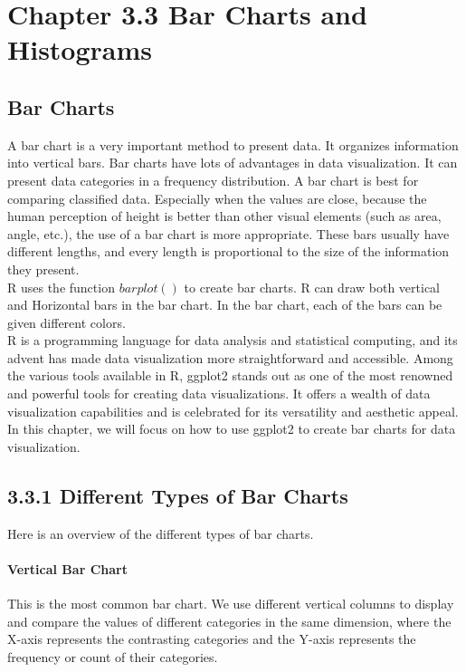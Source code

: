 \documentclass{article}\usepackage[]{graphicx}\usepackage[]{xcolor}
\begin{document}
\section*{Chapter 3.3 Bar Charts and Histograms}
\subsection*{Bar Charts}
A bar chart is a very important method to present data. It organizes information into vertical bars.  Bar charts have lots of advantages in data visualization. It can present data categories in a frequency distribution. A bar chart is best for comparing classified data. Especially when the values are close, because the human perception of height is better than other visual elements (such as area, angle, etc.), the use of a bar chart is more appropriate. These bars usually have different lengths, and every length is proportional to the size of the information they present.\\
R uses the function $barplot()$ to create bar charts. R can draw both vertical and Horizontal bars in the bar chart. In the bar chart, each of the bars can be given different colors.\\
R is a programming language for data analysis and statistical computing, and its advent has made data visualization more straightforward and accessible. Among the various tools available in R, ggplot2 stands out as one of the most renowned and powerful tools for creating data visualizations. It offers a wealth of data visualization capabilities and is celebrated for its versatility and aesthetic appeal. In this chapter, we will focus on how to use ggplot2 to create bar charts for data visualization.\\

\subsection*{3.3.1 Different Types of Bar Charts}
Here is an overview of the different types of bar charts. \\
\paragraph{Vertical Bar Chart}
This is the most common bar chart. We use different vertical columns to display and compare the values of different categories in the same dimension, where the X-axis represents the contrasting categories and the Y-axis represents the frequency or count of their categories.\\
\end{document}
